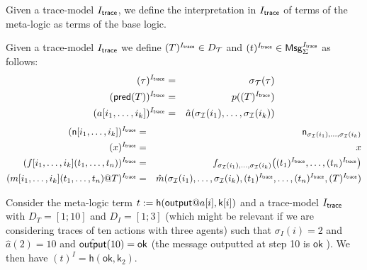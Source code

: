 
Given a trace-model $I_{\textsf{trace}}$, we define the interpretation in $I_{\textsf{trace}}$ of terms of the meta-logic as terms of the base logic.
\begin{definition}
  Given a trace-model $I_{\textsf{trace}}$
  we define $(T)^{I_{\textsf{trace}}} \in D_{\mathcal{T}}$ and $(t)^{I_{\textsf{trace}}} \in \mathsf{Msg}^{I_{\textsf{trace}}}_\Sigma$ as follows:
  \begin{eqnarray*}
    (\tau)^{I_{\textsf{trace}}} &=& \sigma_{\mathcal{T}}(\tau) \\
    (\textsf{pred}(T))^{I_{\textsf{trace}}} &=& p((T)^{I_{\textsf{trace}}}) \\
    (a[i_1,\ldots,i_k])^{I_{\textsf{trace}}} &=& \hat{a}(\sigma_{\mathcal{I}}(i_1),\ldots,\sigma_{\mathcal{I}}(i_k))
  \end{eqnarray*}
  \begin{eqnarray*}
    (\mathsf{n}[i_1,\ldots,i_k])^{I_{\textsf{trace}}} &=& \mathsf{n}_{\sigma_{\mathcal{I}}(i_1),\ldots,\sigma_{\mathcal{I}}(i_k)}
    \\
    (x)^{I_{\textsf{trace}}} &=& x
    \\
    (f[i_1,\ldots,i_k](t_1,\ldots,t_n))^{I_{\textsf{trace}}} &=&
    f_{\sigma_{\mathcal{I}}(i_1),\ldots,\sigma_{\mathcal{I}}(i_k)}\bigl(
      (t_1)^{I_{\textsf{trace}}},\ldots,(t_n)^{I_{\textsf{trace}}}
    \bigr)
    \\
    (m[i_1,\ldots,i_k](t_1,\ldots,t_n)@T)^{I_{\textsf{trace}}} &=&
    \hat{m}(\sigma_{\mathcal{I}}(i_1),\ldots,\sigma_{\mathcal{I}}(i_k),
      (t_1)^{I_{\textsf{trace}}},\ldots,(t_n)^{I_{\textsf{trace}}},
      (T)^{I_{\textsf{trace}}})
  \end{eqnarray*}
\end{definition}

\begin{example}
  Consider the meta-logic term $t := \mathsf{h}(\mout@a[i],\mathsf{k}[i])$
  and a trace-model $I_{\textsf{trace}}$ with $D_T = [1;10]$ and $D_I = [1;3]$
  (which might be relevant if we are considering traces of ten actions
  with three agents) such that $\sigma_I(i)=2$ and $\hat{a}(2)=10$
  and $\hat{\textsf{output}}(10)=\mathsf{ok}$ (the message outputted at step 10
  is $\mathsf{ok}$ ).
  We then have $(t)^I = \mathsf{h}(\mathsf{ok},\mathsf{k}_2)$.
\end{example}

